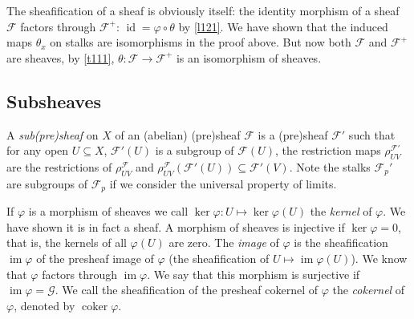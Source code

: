 \documentclass[12pt,letter]{article}
\newcommand{\coker}[0]{\operatorname{coker}}
\newcommand{\im}[0]{\operatorname{im}}
\newcommand{\id}[0]{\operatorname{id}}
\begin{document}
	The sheafification of a sheaf is obviously itself: the identity morphism of a sheaf $\mathscr F$ factors through $\mathscr F^+$: $\id = \varphi\circ \theta$ by \autoref{l121}. We have shown that the induced maps $\theta_x$ on stalks are isomorphisms in the proof above. But now both $\mathscr F$ and $\mathscr F^+$ are sheaves, by \autoref{t111}, $\theta:\mathscr F\to\mathscr F^+$ is an isomorphism of sheaves. 
	\subsection{Subsheaves}\label{ssec-subsheaf}
	A \textit{sub(pre)sheaf} on $X$ of an (abelian) (pre)sheaf $\mathscr F$ is a (pre)sheaf $\mathscr F'$ such that for any open $U\subseteq X$, $\mathscr F'(U)$ is a subgroup of $\mathscr F(U)$, the restriction maps $\rho_{UV}^{\mathscr F'}$ are the restrictions of $\rho_{UV}^{\mathscr F}$ and $\rho_{UV}^{\mathscr F}(\mathscr F'(U))\subseteq \mathscr F'(V)$. Note the stalks $\mathscr F_p'$ are subgroups of $\mathscr F_p$ if we consider the universal property of limits.
	
	If $\varphi$ is a morphism of sheaves we call $\ker\varphi:U\mapsto \ker\varphi(U)$ the \textit{kernel} of $\varphi$. We have shown it is in fact a sheaf. A morphism of sheaves is injective if $\ker\varphi=0$, that is, the kernels of all $\varphi(U)$ are zero. The \textit{image} of $\varphi$ is the sheafification $\im\varphi$ of the presheaf image of $\varphi$ (the sheafification of $U\mapsto \im \varphi(U)$). We know that $\varphi$ factors through $\im\varphi$. We say that this morphism is surjective if $\im\varphi=\mathscr G$. We call the sheafification of the presheaf cokernel of $\varphi$ the \textit{cokernel} of $\varphi$, denoted by $\coker\varphi$.
	
\end{document}
